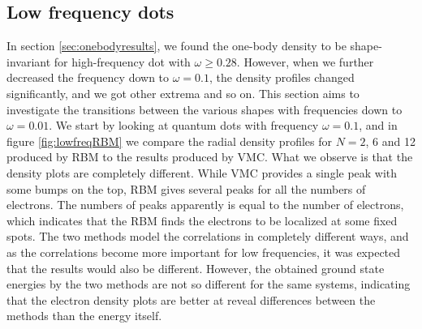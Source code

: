 \subsection{Low frequency dots} \label{sec:lowfrequencies}
In section \ref{sec:onebodyresults}, we found the one-body density to be shape-invariant for high-frequency dot with $\omega\geq0.28$. However, when we further decreased the frequency down to $\omega=0.1$, the density profiles changed significantly, and we got other extrema and so on. This section aims to investigate the transitions between the various shapes with frequencies down to $\omega=0.01$. We start by looking at quantum dots with frequency $\omega=0.1$, and in figure \eqref{fig:lowfreqRBM} we compare the radial density profiles for $N=2$, 6 and 12 produced by RBM to the results produced by VMC. What we observe is that the density plots are completely different. While VMC provides a single peak with some bumps on the top, RBM gives several peaks for all the numbers of electrons. The numbers of peaks apparently is equal to the number of electrons, which indicates that the RBM finds the electrons to be localized at some fixed spots. The two methods model the correlations in completely different ways, and as the correlations become more important for low frequencies, it was expected that the results would also be different. However, the obtained ground state energies by the two methods are not so different for the same systems, indicating that the electron density plots are better at reveal differences between the methods than the energy itself. 

